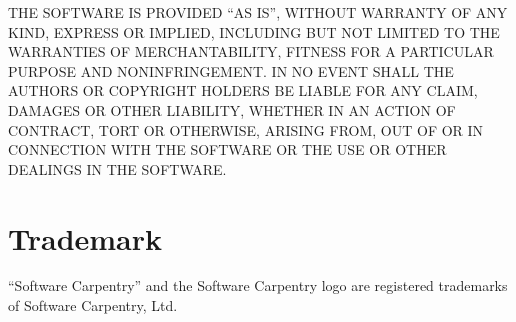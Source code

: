 \documentclass[]{book}
\begin{document}
THE SOFTWARE IS PROVIDED ``AS IS'', WITHOUT WARRANTY OF ANY KIND,
EXPRESS OR IMPLIED, INCLUDING BUT NOT LIMITED TO THE WARRANTIES OF
MERCHANTABILITY, FITNESS FOR A PARTICULAR PURPOSE AND NONINFRINGEMENT.
IN NO EVENT SHALL THE AUTHORS OR COPYRIGHT HOLDERS BE LIABLE FOR ANY
CLAIM, DAMAGES OR OTHER LIABILITY, WHETHER IN AN ACTION OF CONTRACT,
TORT OR OTHERWISE, ARISING FROM, OUT OF OR IN CONNECTION WITH THE
SOFTWARE OR THE USE OR OTHER DEALINGS IN THE SOFTWARE.

\section{Trademark}

``Software Carpentry'' and the Software Carpentry logo are registered
trademarks of Software Carpentry, Ltd.
\end{document}
